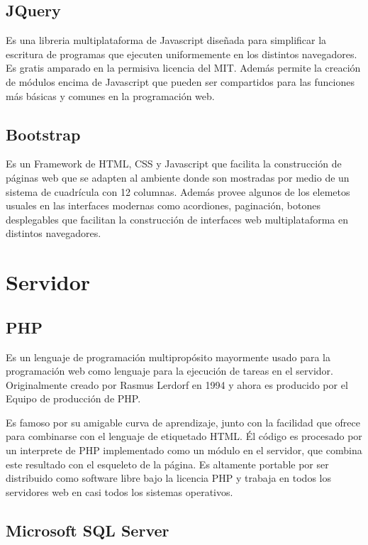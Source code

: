 \subsection{JQuery}
Es una libreria multiplataforma de Javascript diseñada para simplificar la escritura de programas que ejecuten uniformemente en los distintos navegadores. Es gratis amparado en la permisiva licencia del MIT. Además permite la creación de módulos encima de Javascript que pueden ser compartidos para las funciones más básicas y comunes en la programación web.


\subsection{Bootstrap}
Es un Framework de HTML, CSS y Javascript que facilita la construcción de páginas web que se adapten al ambiente donde son mostradas por medio de un sistema de cuadrícula con 12 columnas. Además provee algunos de los elemetos usuales en las interfaces modernas como acordiones, paginación, botones desplegables que facilitan la construcción de interfaces web multiplataforma en distintos navegadores.


\section{Servidor}

\subsection{PHP}

Es un lenguaje de programación multipropósito mayormente usado para la programación web como lenguaje para la ejecución de tareas en el servidor. Originalmente creado por Rasmus Lerdorf en 1994 y ahora es producido por el Equipo de producción de PHP. 

Es famoso por su amigable curva de aprendizaje, junto con la facilidad que ofrece para combinarse con el lenguaje de etiquetado HTML. Él código es procesado por un interprete de PHP implementado como un módulo en el servidor, que combina este resultado con el esqueleto de la página. Es altamente portable por ser distribuido como software libre bajo la licencia PHP y trabaja en todos los servidores web en casi todos los sistemas operativos.

\subsection{Microsoft SQL Server}

